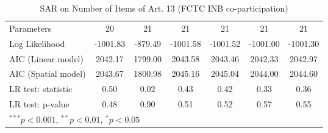 \begin{table}[!h]
\begin{center}
\begin{tabular}{l c c c c c c }
Parameters              & 20           & 21           & 21           & 21           & 21           & 21           \\
Log Likelihood          & -1001.83     & -879.49      & -1001.58     & -1001.52     & -1001.00     & -1001.30     \\
AIC (Linear model)      & 2042.17      & 1799.00      & 2043.58      & 2043.46      & 2042.33      & 2042.97      \\
AIC (Spatial model)     & 2043.67      & 1800.98      & 2045.16      & 2045.04      & 2044.00      & 2044.60      \\
LR test: statistic      & 0.50         & 0.02         & 0.43         & 0.42         & 0.33         & 0.36         \\
LR test: p-value        & 0.48         & 0.90         & 0.51         & 0.52         & 0.57         & 0.55         \\
\bottomrule
\multicolumn{7}{l}{\scriptsize{$^{***}p<0.001$, $^{**}p<0.01$, $^*p<0.05$}}
\end{tabular}
\caption{SAR on Number of Items of Art. 13 (FCTC INB co-participation)}
\label{table:coefficients}
\end{center}
\end{table}
